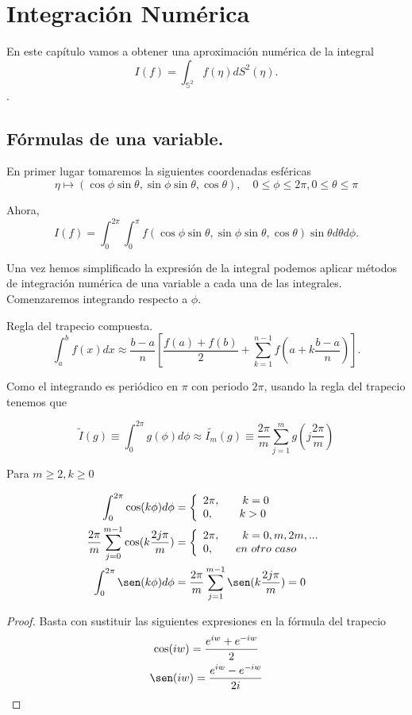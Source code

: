 \chapter[Integración Numérica]{Integración Numérica}
En este capítulo vamos a obtener una aproximación numérica de la integral $$ I(f) = \int_{\mathds{S}^2} f(\eta) dS^2(\eta). $$. 
\section{Fórmulas de una variable.}
En primer lugar tomaremos la siguientes coordenadas esféricas
$$ \eta \mapsto (\cos\phi \sin\theta, \sin\phi \sin\theta,\cos \theta), \quad 0\le \phi \le 2\pi, 0\le \theta \le \pi$$
 
Ahora, 
$$
I(f) = \int_{0}^{2\pi} \int_{0}^{\pi} f(\cos\phi \sin\theta, \sin\phi \sin\theta,\cos \theta)\sin\theta d\theta d\phi. 
$$

Una vez hemos simplificado la expresión de la integral podemos aplicar métodos de integración numérica de una variable a cada una de las integrales. Comenzaremos integrando respecto a $\phi$.
\medskip
\begin{rem}Regla del trapecio compuesta.
	$$\int_{a}^{b} f(x)dx \approx \frac{b-a}{n}\left[\frac{f(a)+f(b)}{2}+\sum_{k=1}^{n-1}f(a+k\frac{b-a}{n})\right].
	$$
\end{rem}

Como el integrando es periódico en $\pi$ con periodo $2\pi$, usando la regla del trapecio tenemos que

$$
\widetilde{I}(g)\equiv \int_{0}^{2\pi} g(\phi)d\phi \approx \widetilde{I_m}(g) \equiv \frac{2\pi}{m} \sum_{j=1}^{m} g(j\frac{2\pi}{m})
$$

\begin{lem} Para $m\ge 2,k\ge 0$
	
	\begin{gather*}
	\begin{aligned}
	\int_{0}^{2\pi} \cos(k\phi)d\phi &= \left\{\begin{array}{ll} 2\pi, \qquad k=0 
											\\ 0 ,  \qquad\  k>0
		\end{array} 
		\right.
	\\
	\frac{2\pi}{m}\sum_{j=0}^{m-1}\cos(k\frac{2j\pi}{m}) &= \left\{\begin{array}{ll} 2\pi, \qquad k=0,m,2m,... 
	\\ 0 ,  \qquad en\ otro\ caso
	\end{array} 
	\right.
	\\
	\int_{0}^{2\pi} \sen(k\phi)d\phi &=  \frac{2\pi}{m}\sum_{j=1}^{m-1}\sen(k\frac{2j\pi}{m}) =0 
	\end{aligned}
	\end{gather*}
\end{lem}
\begin{proof}
Basta con sustituir las siguientes expresiones en la fórmula del trapecio
\begin{gather*}
\cos(iw) = \frac{e^{iw}+e^{-iw}}{2} \\
\sen(iw) = \frac{e^{iw}-e^{-iw}}{2i}
\end{gather*} 
\end{proof}

